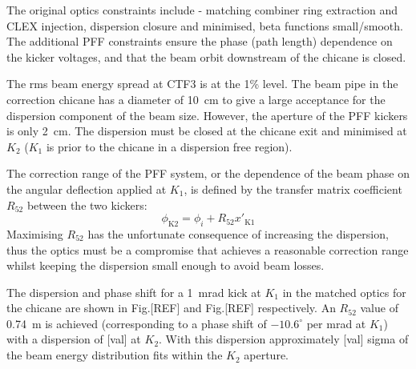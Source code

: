 \documentclass[%
 reprint,
 superscriptaddress,
 amsmath,
 amssymb,
 prstab,
]{revtex4-1}
\begin{document}
The original optics constraints include - matching combiner ring extraction and 
CLEX injection, dispersion closure and minimised, beta functions small/smooth. 
The additional PFF constraints ensure the phase (path length) dependence on the 
kicker voltages, and that the beam orbit downstream of the chicane is closed.

The rms beam energy spread at CTF3 is at the 1\% level. The beam pipe in the 
correction chicane has a diameter of 10~cm to give a large acceptance for the 
dispersion component of the beam size. However, the aperture of the PFF kickers 
is only 2~cm. The dispersion must be closed at the chicane exit and minimised 
at \(K_2\) (\(K_1\) is prior to the chicane in a dispersion free region). 

The correction range of the PFF system, or the dependence of the beam phase on 
the angular deflection applied at \(K_1\), is defined by the transfer matrix 
coefficient \(R_{52}\) between the two kickers:
\begin{equation}
\phi_{\mathrm{K2}} = \phi_i + R_{52}x'_{\mathrm{K1}}
\end{equation}
Maximising \(R_{52}\) has the 
unfortunate consequence of increasing the dispersion, thus the optics must be a 
compromise that achieves a reasonable
correction range whilst keeping the dispersion small enough to avoid beam 
losses.

The dispersion and phase shift for a 1~mrad kick at \(K_1\) in the matched 
optics for the chicane are shown in Fig.[REF] and Fig.[REF] respectively. An 
\(R_52\) value of 0.74~m 
is achieved (corresponding to a phase shift of \(-10.6^\circ\) per mrad at 
\(K_1\)) with 
a dispersion of [val] at \(K_2\). With this dispersion approximately [val] 
sigma of the beam energy distribution fits within the \(K_2\) aperture.
\end{document}
